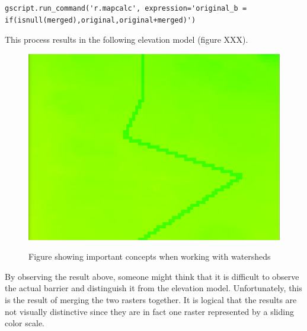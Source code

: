 \begin{lstlisting}
gscript.run_command('r.mapcalc', expression='original_b = if(isnull(merged),original,original+merged)')
\end{lstlisting}

This process results in the following elevation model (figure XXX).

\begin{figure}[h!]
\centering
	{\includegraphics[width=\linewidth]{gfx/Phase_4/Barrier5.png}}
\caption{Figure showing important concepts when working with watersheds}
\end{figure}

By observing the result above, someone might think that it is difficult to observe the actual barrier and distinguish it from the elevation model. Unfortunately, this is the result of merging the two rasters together. It is logical that the results are not visually distinctive since they are in fact one raster represented by a sliding color scale.

